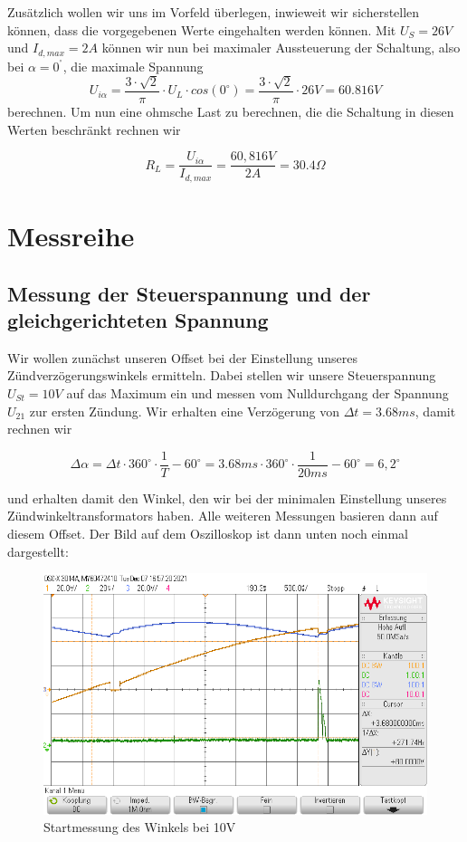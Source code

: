 \documentclass{article}
\begin{document}
Zusätzlich wollen wir uns im Vorfeld überlegen, inwieweit wir sicherstellen können, dass die vorgegebenen Werte eingehalten werden können. Mit $U_{S} = 26V$ und $I_{d,max} = 2A$ können wir nun bei maximaler Aussteuerung der Schaltung, also bei $\alpha = 0^{^{\circ}}$, die maximale Spannung $$U_{i\alpha} = \frac{3\cdot \sqrt{2}}{\pi}\cdot U_{L} \cdot cos(0^{\circ}) = \frac{3\cdot \sqrt{2}}{\pi}\cdot 26V = 60.816V$$
berechnen. Um nun eine ohmsche Last zu berechnen, die die Schaltung in diesen Werten beschränkt rechnen wir

\begin{equation*}
  \label{eq:1}
  R_{L} = \frac{U_{i\alpha}}{I_{d,max}} = \frac{60,816V}{2A} = 30.4 \Omega
\end{equation*}

\section{Messreihe}

\subsection{Messung der Steuerspannung und der gleichgerichteten Spannung}

Wir wollen zunächst unseren Offset bei der Einstellung unseres Zündverzögerungswinkels ermitteln. Dabei stellen wir unsere Steuerspannung $U_{St} = 10V$ auf das Maximum ein und messen vom Nulldurchgang der Spannung $U_{21}$ zur ersten Zündung. Wir erhalten eine Verzögerung von $\Delta t = 3.68ms$, damit rechnen wir

\begin{equation*}
  \label{eq:2}
  \Delta\alpha = \Delta t \cdot 360^{\circ} \cdot \frac{1}{T} - 60^{\circ} = 3.68ms \cdot 360^{\circ} \cdot \frac{1}{20ms} - 60^{\circ} = 6,2^{\circ}
\end{equation*}

und erhalten damit den Winkel, den wir bei der minimalen Einstellung unseres Zündwinkeltransformators haben. Alle weiteren Messungen basieren dann auf diesem Offset. Der Bild auf dem Oszilloskop ist dann unten noch einmal dargestellt:

\begin{figure}[h]
  \centering
  \includegraphics[width=\textwidth]{../assets/images/GEP2/startAngle.png}
  \caption{Startmessung des Winkels bei 10V}
  \label{fig:startAngle}
\end{figure}
\end{document}
